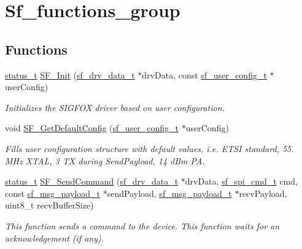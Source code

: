\hypertarget{group__sf__functions__group}{}\section{Sf\+\_\+functions\+\_\+group}
\label{group__sf__functions__group}
\subsection*{Functions}
\begin{DoxyCompactItemize}
\item 
\mbox{\hyperlink{group__ksdk__common_gaaabdaf7ee58ca7269bd4bf24efcde092}{status\+\_\+t}} \mbox{\hyperlink{group__sf__functions__group_gada7c9026ce05c5baaf767bfa10928039}{S\+F\+\_\+\+Init}} (\mbox{\hyperlink{structsf__drv__data__t}{sf\+\_\+drv\+\_\+data\+\_\+t}} $\ast$drv\+Data, const \mbox{\hyperlink{structsf__user__config__t}{sf\+\_\+user\+\_\+config\+\_\+t}} $\ast$user\+Config)
\begin{DoxyCompactList}\small\item\em Initializes the S\+I\+G\+F\+OX driver based on user configuration. \end{DoxyCompactList}\item 
void \mbox{\hyperlink{group__sf__functions__group_gaeac5315858b24e339879e28d7578337d}{S\+F\+\_\+\+Get\+Default\+Config}} (\mbox{\hyperlink{structsf__user__config__t}{sf\+\_\+user\+\_\+config\+\_\+t}} $\ast$user\+Config)
\begin{DoxyCompactList}\small\item\em Fills user configuration structure with default values, i.\+e. E\+T\+SI standard, 55. M\+Hz X\+T\+AL, 3 TX during Send\+Payload, 14 d\+Bm PA. \end{DoxyCompactList}\item 
\mbox{\hyperlink{group__ksdk__common_gaaabdaf7ee58ca7269bd4bf24efcde092}{status\+\_\+t}} \mbox{\hyperlink{group__sf__functions__group_ga9c767a31660b3d561fdba39a47903295}{S\+F\+\_\+\+Send\+Command}} (\mbox{\hyperlink{structsf__drv__data__t}{sf\+\_\+drv\+\_\+data\+\_\+t}} $\ast$drv\+Data, \mbox{\hyperlink{group__sf__enum__group_ga06921e348326a2db772246fef63b2545}{sf\+\_\+spi\+\_\+cmd\+\_\+t}} cmd, const \mbox{\hyperlink{structsf__msg__payload__t}{sf\+\_\+msg\+\_\+payload\+\_\+t}} $\ast$send\+Payload, \mbox{\hyperlink{structsf__msg__payload__t}{sf\+\_\+msg\+\_\+payload\+\_\+t}} $\ast$recv\+Payload, uint8\+\_\+t recv\+Buffer\+Size)
\begin{DoxyCompactList}\small\item\em This function sends a command to the device. This function waits for an acknowledgement (if any). \end{DoxyCompactList}\item 

\end{DoxyCompactItemize}
